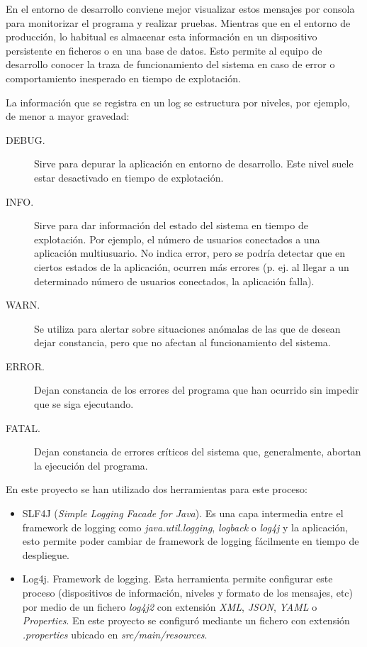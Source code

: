 En el entorno de desarrollo conviene mejor visualizar estos mensajes por consola para monitorizar el programa y realizar pruebas. Mientras que en el entorno de producción, lo habitual es almacenar esta información en un dispositivo persistente en ficheros o en una base de datos. Esto permite al equipo de desarrollo conocer la traza de funcionamiento del sistema en caso de error o comportamiento inesperado en tiempo de explotación.

La información que se registra en un log se estructura por niveles, por ejemplo, de menor a mayor gravedad:
\begin{description}
	\item[DEBUG.] Sirve para depurar la aplicación en entorno de desarrollo. Este nivel suele estar desactivado en tiempo de explotación.
	\item[INFO.] Sirve para dar información del estado del sistema en tiempo de explotación. Por ejemplo, el número de usuarios conectados a una aplicación multiusuario. No indica error, pero se podría detectar que en ciertos estados de la aplicación, ocurren más errores (p. ej. al llegar a un determinado número de usuarios conectados, la aplicación falla).
	\item[WARN.] Se utiliza para alertar sobre situaciones anómalas de las que de desean dejar constancia, pero que no afectan al funcionamiento del sistema. 
	\item[ERROR.] Dejan constancia de los errores del programa que han ocurrido sin impedir que se siga ejecutando.
	\item[FATAL.] Dejan constancia de errores críticos del sistema que, generalmente, abortan la ejecución del programa.
\end{description}

En este proyecto se han utilizado dos herramientas para este proceso:
\begin{itemize}
	\item SLF4J (\textit{Simple Logging Facade for Java}). Es una capa intermedia entre el framework de logging como \textit{java.util.logging}, \textit{logback} o \textit{log4j} y la aplicación, esto permite poder cambiar de framework de logging fácilmente en tiempo de despliegue.
	
	\item Log4j. Framework de logging. Esta herramienta permite configurar este proceso (dispositivos de información, niveles y formato de los mensajes, etc) por medio de un fichero \textit{log4j2} con extensión \textit{XML}, \textit{JSON}, \textit{YAML} o \textit{Properties}. En este proyecto se configuró mediante un fichero con extensión \textit{.properties} ubicado en \textit{src/main/resources}.
\end{itemize}

